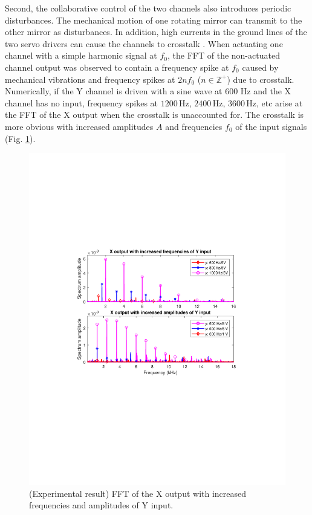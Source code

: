 \documentclass [11pt, proquest] {uwthesis}[2020/02/24]
\begin{document}
Second, the collaborative control of the two channels also introduces
periodic disturbances. The mechanical motion of one rotating mirror
can transmit to the other mirror as disturbances. In addition, high
currents in the ground lines of the two servo drivers can cause the
channels to crosstalk \cite{Cambridge2008}. When actuating one channel
with a simple harmonic signal at $f_{0}$, the FFT of the non-actuated
channel output was observed to contain a frequency spike at $f_{0}$
caused by mechanical vibrations and frequency spikes at $2nf_{0}$
($n\in\mathbb{Z}^{+}$) due to crosstalk. Numerically, if the Y channel
is driven with a sine wave at 600 Hz and the X channel has no input,
frequency spikes at $1200\,\text{Hz}$, $2400\,\text{Hz}$, $3600\,\text{Hz}$,
etc arise at the FFT of the X output when the crosstalk is unaccounted
for. The crosstalk is more obvious with increased amplitudes $A$
and frequencies $f_{0}$ of the input signals (Fig. \ref{fig:FFT-of-the}).
\begin{figure}[!ht]
\begin{centering}
\includegraphics[width=13cm]{Fractional-order-RC/Increase_frequency_mag}
\par\end{centering}
\caption{\label{fig:FFT-of-the}(Experimental result) FFT of the X output with
increased frequencies and amplitudes of Y input.}
\end{figure}
\end{document}

